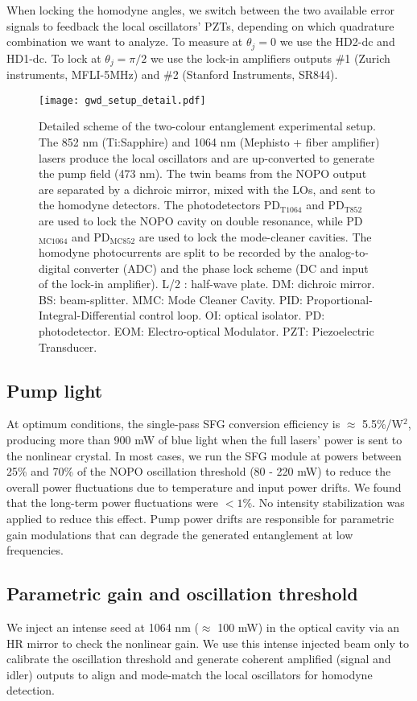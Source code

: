 \documentclass[final,twocolumn,english,prl,notitlepage,nofootinbib,floatfix,longbibliography,superscriptaddress
]{revtex4-2}
\begin{document}
When locking the homodyne angles, we switch between the two available error signals to feedback the local oscillators' PZTs, depending on which quadrature combination we want to analyze. To measure at $\theta_j =0$ we use the HD2-dc and HD1-dc. To lock at $\theta_j=\pi/2$ we use the lock-in amplifiers outputs \#1 (Zurich instruments, MFLI-5MHz) and \#2 (Stanford Instruments, SR844).
\begin{figure*}[ht]
\begin{center}
\texttt{[image: gwd\_setup\_detail.pdf]} 
\caption{Detailed scheme of the two-colour entanglement experimental setup. The 852 nm (Ti:Sapphire) and 1064 nm (Mephisto + fiber amplifier) lasers produce the local oscillators and are up-converted to generate the pump field (473 nm). The twin beams from the NOPO output are separated by a dichroic mirror, mixed with the LOs, and sent to the homodyne detectors. The photodetectors PD$_{\text{T1064}}$ and PD$_{\text{T852}}$ are used to lock the NOPO cavity on double resonance, while PD$_{\text{MC1064}}$ and PD$_{\text{MC852}}$ are used to lock the mode-cleaner cavities. The homodyne photocurrents are split to be recorded by the analog-to-digital converter (ADC) and the phase lock scheme (DC and input of the lock-in amplifier). L/2 : half-wave plate. DM: dichroic mirror. BS: beam-splitter. MMC: Mode Cleaner Cavity. PID: Proportional-Integral-Differential control loop. OI: optical isolator. PD: photodetector. EOM: Electro-optical Modulator. PZT: Piezoelectric Transducer. }
\label{fig:setup_detailed}
\end{center}
\end{figure*}

\subsection*{Pump light}
At optimum conditions, the single-pass SFG conversion efficiency is  $\approx$ 5.5\%/W$^2$, producing more than 900 mW of blue light when the full lasers' power is sent to the nonlinear crystal. In most cases, we run the SFG module at powers between 25\% and 70\% of the NOPO oscillation threshold (80 - 220 mW) to reduce the overall power fluctuations due to temperature and input power drifts.  We found that the long-term power fluctuations were $< 1\%$. No intensity stabilization was applied to reduce this effect. Pump power drifts are responsible for parametric gain modulations that can degrade the generated entanglement at low frequencies.\par
\subsection*{Parametric gain and oscillation threshold}
We inject an intense seed at 1064 nm ($\approx$ 100 mW) in the optical cavity via an HR mirror to check the nonlinear gain. We use this intense injected beam only to calibrate the oscillation threshold and generate coherent amplified (signal and idler) outputs to align and mode-match the local oscillators for homodyne detection.\par
\end{document}
